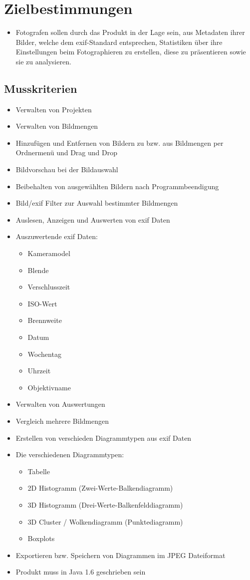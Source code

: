 \section{Zielbestimmungen}
\begin{itemize}
  \item Fotografen sollen durch das Produkt in der Lage sein, aus Metadaten ihrer Bilder, welche dem \gls{exif}-Standard entsprechen, Statistiken über ihre Einstellungen beim Fotographieren zu erstellen, diese zu präsentieren sowie sie zu analysieren.
  \end{itemize} 
\subsection{Musskriterien} 
\begin{itemize}
	\item Verwalten von Projekten
	\item Verwalten von Bildmengen
	\item Hinzufügen und Entfernen von Bildern zu bzw. aus Bildmengen per Ordnermenü und Drag und Drop
	\item Bildvorschau bei der Bildauswahl
	\item Beibehalten von ausgewählten Bildern nach Programmbeendigung
	\item Bild/\gls{exif} Filter zur Auswahl bestimmter Bildmengen
	\item Auslesen, Anzeigen und Auswerten von \gls{exif} Daten
	\item Auszuwertende \gls{exif} Daten:
			\begin{itemize}
			\item Kameramodel
			\item Blende 
			\item Verschlusszeit
			\item ISO-Wert
			\item Brennweite
			\item Datum
			\item Wochentag
			\item Uhrzeit
			\item Objektivname
		\end{itemize}
	\item Verwalten von Auswertungen
	\item Vergleich mehrere Bildmengen
	\item Erstellen von verschieden Diagrammtypen aus \gls{exif} Daten
	\item Die verschiedenen Diagrammtypen:
		\begin{itemize}
		  \item Tabelle
			\item 2D Histogramm (Zwei-Werte-Balkendiagramm)
			\item 3D Histogramm (Drei-Werte-Balkenfelddiagramm)
			\item 3D Cluster / Wolkendiagramm (Punktediagramm)
			\item Boxplots
		\end{itemize}
	\item Exportieren bzw. Speichern von Diagrammen im JPEG Dateiformat
	\item Produkt muss in Java 1.6 geschrieben sein	
\end{itemize}

